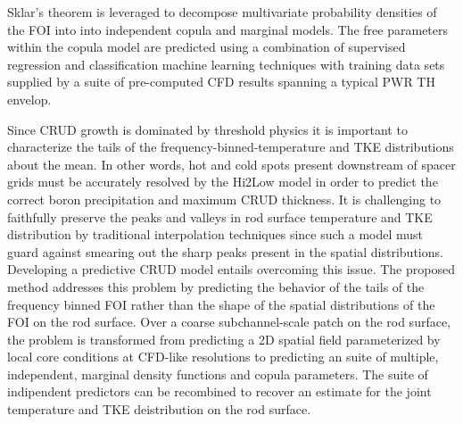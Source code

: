 Sklar's theorem is leveraged to decompose multivariate probability
densities of the FOI into into independent copula and marginal models. The free parameters
within the copula model are predicted using a combination of supervised
regression and classification machine learning techniques with training data
sets supplied by a suite of pre-computed CFD results spanning a typical PWR TH
envelop. 

Since CRUD growth is dominated by threshold physics
it is important to characterize the tails of the
frequency-binned-temperature and TKE distributions about the mean.  In other
words, hot and cold spots present downstream of spacer grids must be accurately
resolved by the Hi2Low model in order to predict the correct boron
precipitation and maximum CRUD thickness.
It is challenging to faithfully
preserve the peaks and valleys in rod surface temperature and TKE distribution
by traditional interpolation techniques since such a model must guard against
smearing out the sharp peaks present in the spatial distributions.  Developing
a predictive CRUD model entails overcoming this issue. The proposed method
addresses this problem by predicting the behavior of the tails of the frequency
binned FOI rather than the shape of the spatial distributions of the FOI on
the rod surface.  Over a coarse subchannel-scale patch on the rod surface, the
problem is transformed from predicting a 2D spatial field parameterized by local core conditions at CFD-like resolutions to
predicting an suite of multiple, independent, marginal density functions and copula parameters.  The suite of indipendent predictors can be recombined to recover an estimate for the joint temperature and TKE deistribution on the rod surface.
